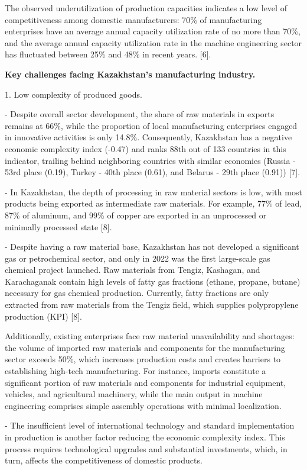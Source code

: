 \begin{multicols}{2}
The observed underutilization of production capacities indicates a low
level of competitiveness among domestic manufacturers: 70\% of
manufacturing enterprises have an average annual capacity utilization
rate of no more than 70\%, and the average annual capacity utilization
rate in the machine engineering sector has fluctuated between 25\% and
48\% in recent years. {[}6{]}.

{\bfseries Key challenges facing Kazakhstan's manufacturing industry.}

1. Low complexity of produced goods.

- Despite overall sector development, the share of raw materials in
exports remains at 66\%, while the proportion of local manufacturing
enterprises engaged in innovative activities is only 14.8\%.
Consequently, Kazakhstan has a negative economic complexity index
(-0.47) and ranks 88th out of 133 countries in this indicator, trailing
behind neighboring countries with similar economies (Russia - 53rd place
(0.19), Turkey - 40th place (0.61), and Belarus - 29th place (0.91))
{[}7{]}.

- In Kazakhstan, the depth of processing in raw material sectors is low,
with most products being exported as intermediate raw materials. For
example, 77\% of lead, 87\% of aluminum, and 99\% of copper are exported
in an unprocessed or minimally processed state {[}8{]}.

- Despite having a raw material base, Kazakhstan has not developed a
significant gas or petrochemical sector, and only in 2022 was the first
large-scale gas chemical project launched. Raw materials from Tengiz,
Kashagan, and Karachaganak contain high levels of fatty gas fractions
(ethane, propane, butane) necessary for gas chemical production.
Currently, fatty fractions are only extracted from raw materials from
the Tengiz field, which supplies polypropylene production (KPI) {[}8{]}.

Additionally, existing enterprises face raw material unavailability and
shortages: the volume of imported raw materials and components for the
manufacturing sector exceeds 50\%, which increases production costs and
creates barriers to establishing high-tech manufacturing. For instance,
imports constitute a significant portion of raw materials and components
for industrial equipment, vehicles, and agricultural machinery, while
the main output in machine engineering comprises simple assembly
operations with minimal localization.

- The insufficient level of international technology and standard
implementation in production is another factor reducing the economic
complexity index. This process requires technological upgrades and
substantial investments, which, in turn, affects the competitiveness of
domestic products.


\end{multicols}
